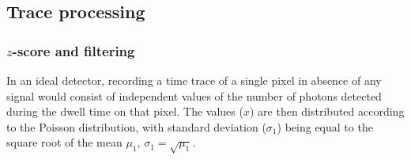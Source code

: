 \documentclass[a4paper,11pt,]{article}
\begin{document}
\subsection{Trace processing}

\subsubsection{$z$-score and filtering}

In an ideal detector, recording a time trace of a single pixel in absence of any signal would consist of independent values of the number of photons detected during the dwell time on that pixel.
The values ($x$) are then distributed according to the Poisson distribution, with standard deviation ($\sigma_1$) being equal to the square root of the mean $\mu_1$, $\sigma_1=\sqrt{\mu_1}$.
\end{document}
